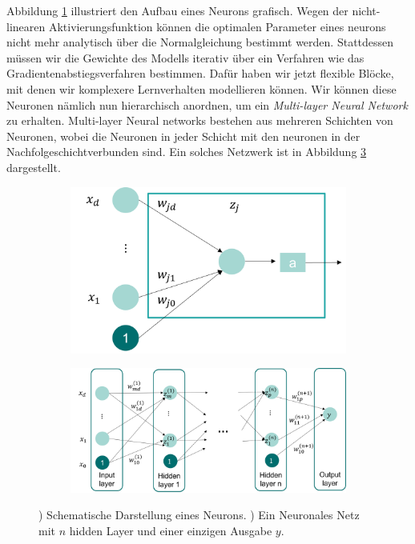 Abbildung \ref{fig:ml-neuron} illustriert den Aufbau eines Neurons grafisch. 
Wegen der nicht-linearen Aktivierungsfunktion können die optimalen Parameter eines neurons nicht mehr
analytisch über die Normalgleichung bestimmt werden. Stattdessen 
müssen wir die Gewichte des Modells iterativ über ein Verfahren
 wie das Gradientenabstiegsverfahren bestimmen. Dafür haben wir jetzt flexible Blöcke, 
 mit denen wir komplexere Lernverhalten modellieren können. Wir können diese Neuronen nämlich nun hierarchisch anordnen, um ein \emph{Multi-layer Neural Network} zu erhalten. Multi-layer Neural networks bestehen aus mehreren Schichten von Neuronen, wobei die Neuronen in jeder Schicht mit den neuronen in der Nachfolgeschichtverbunden sind. Ein solches Netzwerk ist in Abbildung \ref{fig:ml-multi-layer} dargestellt.
\begin{figure}[h!]

    \begin{subfigure}[h]{0.45\textwidth}
        \includegraphics[width=\textwidth]{Figures/ML-neuron-2.png}
        \caption{}
        \label{fig:ml-neuron}
    \end{subfigure}
    \hfill
    \begin{subfigure}[h]{0.5\textwidth}
        \includegraphics[width=\textwidth]{Figures/ML-multlayer-nn.png}
        \caption{}
        \label{fig:ml-basisfunktionen-mlp}
    \end{subfigure}
    \caption{) Schematische Darstellung eines Neurons. ) Ein Neuronales Netz mit $n$ hidden Layer und einer einzigen Ausgabe $y$.}
    \label{fig:ml-multi-layer}        
\end{figure}

